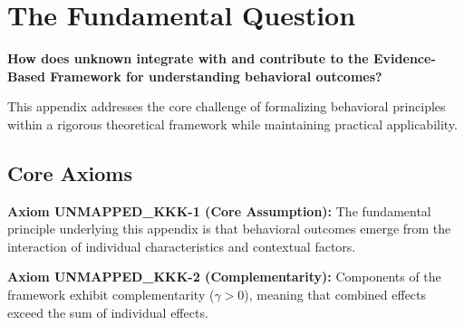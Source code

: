 

\section{The Fundamental Question}
\label{sec:kkk-fundamental}

\begin{tcolorbox}[
    colback=red!5!white,
    colframe=red!75!black,
    title={\textbf{Fundamental Question}}
]
\textbf{How does unknown integrate with and contribute to the
Evidence-Based Framework for understanding behavioral outcomes?}

This appendix addresses the core challenge of formalizing behavioral principles
within a rigorous theoretical framework while maintaining practical applicability.
\end{tcolorbox}




\subsection{Core Axioms}
\label{sec:kkk-axioms}

\begin{tcolorbox}[colback=yellow!5!white,colframe=yellow!75!black,title=Axiom UNMAPPED_KKK-1: Fundamental Principle]
\textbf{Axiom UNMAPPED_KKK-1 (Core Assumption):}
The fundamental principle underlying this appendix is that behavioral outcomes
emerge from the interaction of individual characteristics and contextual factors.
\end{tcolorbox}

\begin{tcolorbox}[colback=yellow!5!white,colframe=yellow!75!black,title=Axiom UNMAPPED_KKK-2: Complementarity]
\textbf{Axiom UNMAPPED_KKK-2 (Complementarity):}
Components of the framework exhibit complementarity ($\gamma > 0$), meaning
that combined effects exceed the sum of individual effects.
\end{tcolorbox}



